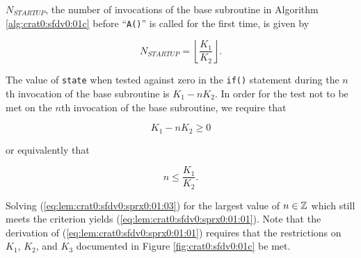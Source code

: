 \begin{vworklemmastatement}
\label{lem:crat0:sfdv0:sprx0:01}
$N_{STARTUP}$, the number of invocations of the base subroutine
in Algorithm \ref{alg:crat0:sfdv0:01c} before ``\texttt{A()}'' is called
for the first time, is given by

\begin{equation}
\label{eq:lem:crat0:sfdv0:sprx0:01:01}
N_{STARTUP} = 
\left\lfloor
{
\frac{K_1}{K_2}
}
\right\rfloor .
\end{equation} 
\end{vworklemmastatement}
\begin{vworklemmaproof}
The value of \texttt{state} when tested against
zero in the \texttt{if()} statement during the $n$th invocation
of the base subroutine is $K_1 - n K_2$.  In order for the test
not to be met on the $n$th invocation
of the base subroutine, we require that

\begin{equation}
\label{eq:lem:crat0:sfdv0:sprx0:01:02}
K_1 - n K_2 \geq 0
\end{equation} 

\noindent{}or equivalently that

\begin{equation}
\label{eq:lem:crat0:sfdv0:sprx0:01:03}
n \leq \frac{K_1}{K_2} .
\end{equation} 

Solving (\ref{eq:lem:crat0:sfdv0:sprx0:01:03}) for the 
largest value of $n \in {\mathbb{Z}}$ which still meets the criterion
yields (\ref{eq:lem:crat0:sfdv0:sprx0:01:01}).  Note that 
the derivation of (\ref{eq:lem:crat0:sfdv0:sprx0:01:01}) requires
that the restrictions on $K_1$, $K_2$, and $K_3$ documented in
Figure \ref{fig:crat0:sfdv0:01c} be met.
\end{vworklemmaproof}

